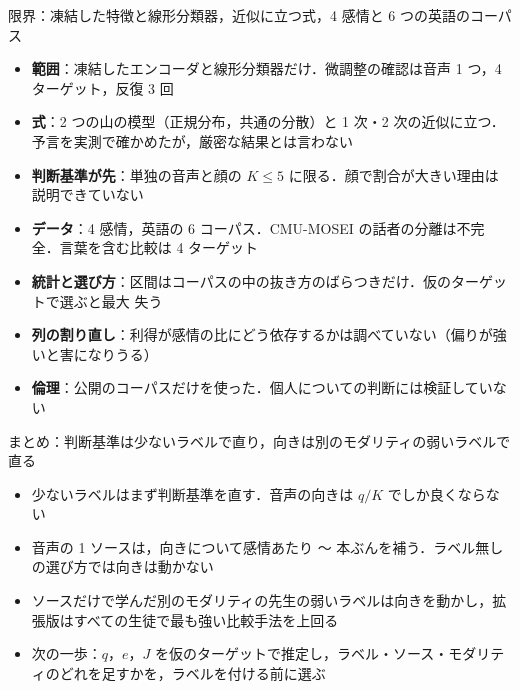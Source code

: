 \begin{frame}{限界：凍結した特徴と線形分類器，近似に立つ式，4 感情と 6 つの英語のコーパス}
  \vspace{-0.2em}
  \begin{itemize}\scriptsize\setlength{\itemsep}{4pt}
        \item \textbf{範囲}：凍結したエンコーダと線形分類器だけ．微調整の確認は音声 1 つ，4 ターゲット，反復 3 回
        \item \textbf{式}：2 つの山の模型（正規分布，共通の分散）と 1 次・2 次の近似に立つ．予言を実測で確かめたが，厳密な結果とは言わない
        \item \textbf{判断基準が先}：単独の音声と顔の $K\le5$ に限る．顔で割合が大きい理由は説明できていない
        \item \textbf{データ}：4 感情，英語の 6 コーパス．CMU-MOSEI の話者の分離は不完全．言葉を含む比較は 4 ターゲット
        \item \textbf{統計と選び方}：区間はコーパスの中の抜き方のばらつきだけ．仮のターゲットで選ぶと最大  \pt 失う
        \item \textbf{列の割り直し}：利得が感情の比にどう依存するかは調べていない（偏りが強いと害になりうる）
        \item \textbf{倫理}：公開のコーパスだけを使った．個人についての判断には検証していない
      \end{itemize}
\end{frame}

\begin{frame}{まとめ：判断基準は少ないラベルで直り，向きは別のモダリティの弱いラベルで直る}
  \vspace{0.3em}
  \begin{itemize}\footnotesize\setlength{\itemsep}{10pt}
        \item 少ないラベルはまず判断基準を直す．音声の向きは $q/K$ でしか良くならない
        \item 音声の 1 ソースは，向きについて感情あたり 〜 本ぶんを補う．ラベル無しの選び方では向きは動かない
        \item ソースだけで学んだ別のモダリティの先生の弱いラベルは向きを動かし，拡張版はすべての生徒で最も強い比較手法を上回る
        \item 次の一歩：$q$，$e$，$J$ を仮のターゲットで推定し，ラベル・ソース・モダリティのどれを足すかを，ラベルを付ける前に選ぶ
      \end{itemize}
\end{frame}

